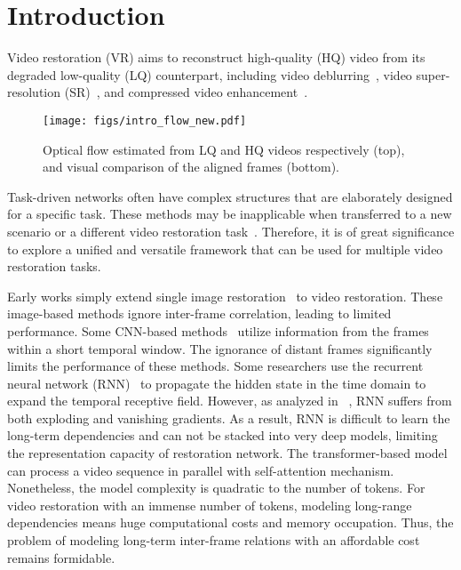 \documentclass[nohyperref]{article}
\theoremstyle{plain}
\theoremstyle{definition}
\theoremstyle{remark}
\begin{document}
\vspace{-6mm}
\section{Introduction}
\label{Introduction}
Video restoration (VR) aims to reconstruct high-quality (HQ) video from its degraded low-quality (LQ) counterpart, including video deblurring~\cite{r15}, video super-resolution (SR)~\cite{r10,r25}, and compressed video enhancement~\cite{r12}. 

\begin{figure}[t!]
    \centering
    \texttt{[image: figs/intro\_flow\_new.pdf]}
    \vspace{-7mm} 
    \caption{Optical flow estimated from LQ and HQ videos respectively (top), and visual comparison of the aligned frames (bottom).}
    \label{fig:intro_flow}
\vspace{-6mm} 
\end{figure}

Task-driven networks often have complex structures that are elaborately designed for a specific task. These methods may be inapplicable when transferred to a new scenario or a different video restoration task~\cite{r13,deng2020spatio,cao2021video}. Therefore, it is of great significance to explore a unified and versatile framework that can be used for multiple video restoration tasks.


Early works simply extend single image restoration~\cite{r34,r35,r36,pngan} to video restoration. These image-based methods ignore inter-frame correlation, leading to limited performance. Some CNN-based methods~\cite{r11, r14, deng2020spatio} utilize information from the frames within a short temporal window. The ignorance of distant frames significantly limits the performance of these methods. Some researchers use the recurrent neural network (RNN)~\cite{r40,r24,r41,r25} to propagate the hidden state in the time domain to expand the temporal receptive field. However, as analyzed in ~\cite{jozefowicz2015empirical}, RNN suffers from both exploding and vanishing gradients. As a result, RNN is difficult to learn the long-term dependencies and can not be stacked into very deep models, limiting the representation capacity of restoration network.
The transformer-based model~\cite{cao2021video, FGST} can process a video sequence in parallel with self-attention mechanism. Nonetheless, the model complexity is quadratic to the number of tokens. For video restoration with an immense number of tokens, modeling long-range dependencies means huge computational costs and memory occupation. Thus, the problem of modeling long-term inter-frame relations with an affordable cost remains formidable. 
\end{document}
